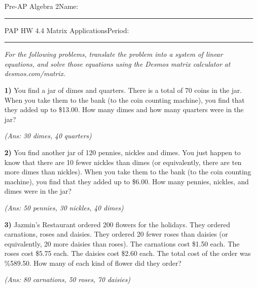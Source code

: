 \documentclass[10pt,letterpaper]{memoir}
\begin{document}
\pagestyle{plain}
\checkandfixthelayout



{\small Pre-AP Algebra 2}\hfill Name: \rule{2in}{0.15mm}

{\Large PAP HW 4.4 Matrix Applications}\hfill Period: \rule{0.5in}{0.15mm}

{\itshape
For the following problems, translate the problem into a system of linear equations,
and solve those equations using the Desmos matrix calculator at {\ttfamily desmos.com/matrix}.
\vspace{1.5em}
}




{\bfseries\large 1)} 
You find a jar of dimes and quarters.
There is a total of 70 coins in the jar.
When you take them to the bank (to the coin counting machine),
you find that they added up to \$13.00.
How many dimes and how many quarters were in the jar?

\myWideMatrixTable[-0.1in]
\vspace{0.5in}
\hfill{\itshape (Ans: 30 dimes, 40 quarters)}
\vspace{2em}




{\bfseries\large 2)} 
You find another jar of 120 pennies, nickles and dimes.
You just happen to know that there are 10 fewer nickles than dimes
(or equivalently, there are ten more dimes than nickles).
When you take them to the bank (to the coin counting machine),
you find that they added up to \$6.00.
How many pennies, nickles, and dimes were in the jar?

\myWideMatrixTable[-0.1in]

\vspace{0.5in}
\hfill{\itshape (Ans: 50 pennies, 30 nickles, 40 dimes)}
\vspace{2em}



\newpage
{\bfseries\large 3)} 
Jazmin's Restaurant ordered 200 flowers for the holidays.
They ordered carnations, roses and daisies.
They ordered 20 fewer roses than daisies
(or equivalently, 20 more daisies than roses).
The carnations cost \$1.50 each.
The roses cost \$5.75 each.
The daisies cost \$2.60 each.
The total cost of the order was \%589.50.
How many of each kind of flower did they order?

\myWideMatrixTable[-0.1in]

\vspace{0.5in}
\hfill{\itshape (Ans: 80 carnations, 50 roses, 70 daisies)}
\vspace{2em}
\end{document}
